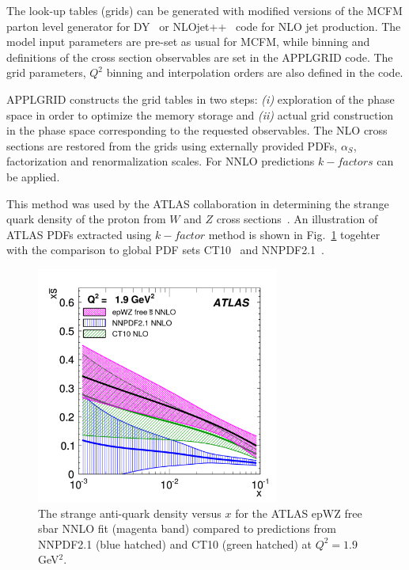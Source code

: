 \begin{description}
\begin{itemize}
The look-up tables (grids) can be generated with modified versions
of the MCFM parton level generator for DY~\cite{Campbell:1999ah,Campbell:2000je,Campbell:2010ff} 
or NLOjet++~\cite{Nagy:1998bb,Nagy:2001fj} code for NLO jet production.
The model input parameters are pre-set as usual for MCFM, 
while binning and definitions of the
cross section observables are set in the APPLGRID code.
%
The grid parameters, \(Q^2\) binning
and interpolation orders are also defined in the code.

APPLGRID constructs the grid tables in two 
steps: {\it (i)} exploration of the phase space in order
to optimize the memory storage and {\it (ii)} actual grid
construction in the phase space corresponding to the 
requested observables.
The NLO cross sections are restored from the grids
using externally provided PDFs, \(\alpha_S\), factorization and 
renormalization scales. For NNLO predictions $k-factors$ can be applied.

This method was used by the ATLAS collaboration in determining the strange 
quark density of the proton from $W$ and $Z$ cross sections~\cite{atlas:strange}. 
An illustration of ATLAS PDFs extracted using $k-factor$ method is shown 
in Fig.~\ref{fig:atlas} togehter with the comparison to global PDF sets 
CT10~\cite{CT10pdf} and NNPDF2.1~\cite{NNPDFpdf}.

\begin{figure}[!ht]
   \centering
   \includegraphics[width=8cm]{atlas.pdf}
   \caption{The strange anti-quark density versus $x$ for the ATLAS epWZ free sbar NNLO fit (magenta band) compared to predictions from NNPDF2.1 (blue hatched) and CT10 (green hatched) at $Q^2= 1.9$ GeV$^2$.}
 \label{fig:atlas}
\end{figure}



\end{itemize}
\end{description}
